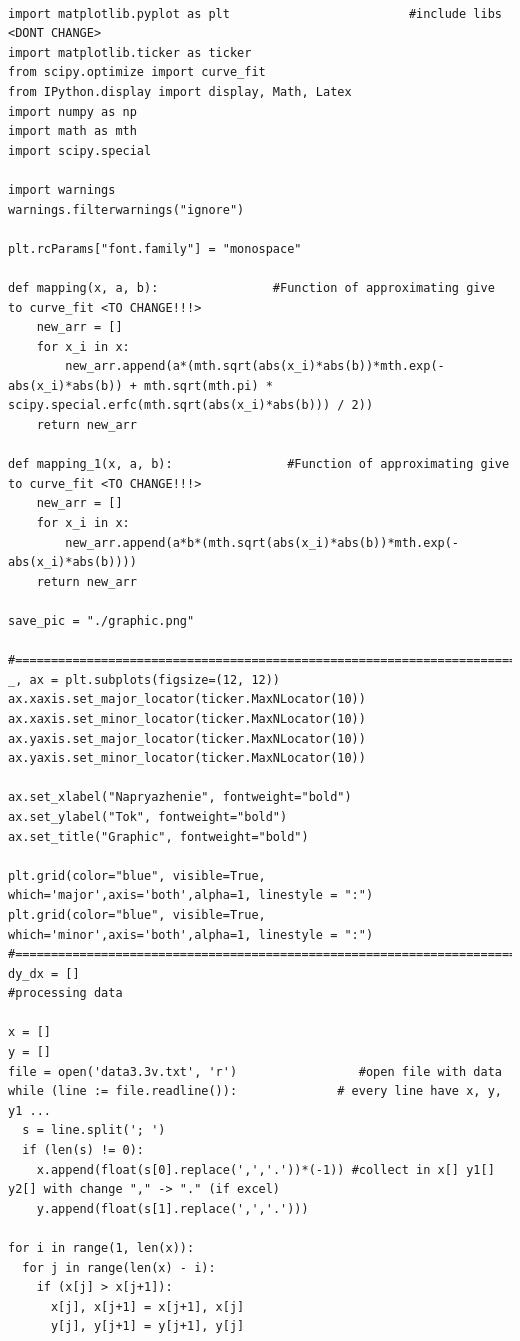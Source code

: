 \begin{lstlisting} 

import matplotlib.pyplot as plt                         #include libs  <DONT CHANGE>
import matplotlib.ticker as ticker
from scipy.optimize import curve_fit
from IPython.display import display, Math, Latex
import numpy as np
import math as mth
import scipy.special

import warnings
warnings.filterwarnings("ignore")

plt.rcParams["font.family"] = "monospace"

def mapping(x, a, b):                #Function of approximating give to curve_fit <TO CHANGE!!!>
    new_arr = []
    for x_i in x:
        new_arr.append(a*(mth.sqrt(abs(x_i)*abs(b))*mth.exp(-abs(x_i)*abs(b)) + mth.sqrt(mth.pi) * scipy.special.erfc(mth.sqrt(abs(x_i)*abs(b))) / 2))
    return new_arr

def mapping_1(x, a, b):                #Function of approximating give to curve_fit <TO CHANGE!!!>
    new_arr = []
    for x_i in x:
        new_arr.append(a*b*(mth.sqrt(abs(x_i)*abs(b))*mth.exp(-abs(x_i)*abs(b))))
    return new_arr

save_pic = "./graphic.png"

#==================================================================================================
_, ax = plt.subplots(figsize=(12, 12))
ax.xaxis.set_major_locator(ticker.MaxNLocator(10))
ax.xaxis.set_minor_locator(ticker.MaxNLocator(10))
ax.yaxis.set_major_locator(ticker.MaxNLocator(10))
ax.yaxis.set_minor_locator(ticker.MaxNLocator(10))

ax.set_xlabel("Napryazhenie", fontweight="bold")
ax.set_ylabel("Tok", fontweight="bold")
ax.set_title("Graphic", fontweight="bold")

plt.grid(color="blue", visible=True, which='major',axis='both',alpha=1, linestyle = ":")
plt.grid(color="blue", visible=True, which='minor',axis='both',alpha=1, linestyle = ":")
#==================================================================================================
dy_dx = []
#processing data

x = []
y = []
file = open('data3.3v.txt', 'r')                 #open file with data
while (line := file.readline()):              # every line have x, y, y1 ...
  s = line.split('; ')
  if (len(s) != 0):
    x.append(float(s[0].replace(',','.'))*(-1)) #collect in x[] y1[] y2[] with change "," -> "." (if excel)
    y.append(float(s[1].replace(',','.')))

for i in range(1, len(x)):
  for j in range(len(x) - i):
    if (x[j] > x[j+1]):
      x[j], x[j+1] = x[j+1], x[j]
      y[j], y[j+1] = y[j+1], y[j]



\end{lstlisting}
